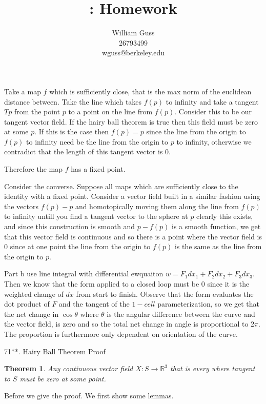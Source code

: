\documentclass[letter]{article}
\title{\bCLASS: Homework \bHWN}
\author{William Guss\\26793499\\wguss@berkeley.edu}
\newtheorem{theorem}{Theorem}
\newenvironment{menumerate}{%
  \edef\backupindent{\the\parindent}%
  \enumerate%
  \setlength{\parindent}{\backupindent}%
}{\endenumerate}
\begin{document}
\maketitle
\thispagestyle{empty}


\begin{menumerate}
    \setcounter{enumi}{54}
    \item Take a map $f$ which is sufficiently close, that is 
    the max norm of the euclidean distance between.
    Take the line which takes $f(p)$ to infinity and take a tangent $Tp$ from the point $p$
    to a point on the line from $f(p).$ Consider this to be our tangent vector field. 
    If the hairy ball theorem is true then this field must be zero at some $p$. If this is the case
    then $f(p) = p$ since the line from the origin to $f(p)$ to infinity need be the line from 
    the origin to $p$ to infinity, otherwise we contradict that the length of this tangent vector is $0.$

    Therefore the map $f$ has a fixed point.

    Consider the converse. Suppose all maps which are sufficiently close to the identity with a fixed point. 
    Consider a vector field built in a similar fashion using the vectors $f(p) - p$ and homotopically moving them along the line
    from $f(p)$ to infinity untill you find a tangent vector to the sphere at $p$ clearly this exists, and since this construction is smooth
    and $p-f(p)$ is a smooth function, we get that this vector field is continuous and so there is a point where the vector
    field is $0$ since at one point the line from the origin to $f(p)$ is the same as the line from the origin
    to $p.$


    \item Part b use line integral with differential ewquaiton
    $w = F_1dx_1 + F_2dx_2 + F_3dx_3.$ Then we know that the form applied to a closed loop
    must be $0$ since it is the weighted change of $dx$ from start to finish. Observe that 
    the form evaluates the dot product of $F$ and the tangent of the $1-cell$ parameterization,
    so we get that the net change in $\cos\theta$ where $\theta$ is the angular difference between the curve
    and the vector field, is zero and so the total net change in angle is proportional to $2\pi.$
    The proportion is furthermore only dependent on orientation of the curve.






    \item 71**. Hairy Ball Theorem Proof
    \begin{theorem}
        Any continuous vector field $X: S \to \mathbb{R}^3$ that is every where tangent to $S$
        must be zero at some point.
    \end{theorem}
    Before we give the proof. We first show some lemmas.


\end{menumerate}
\end{document}
